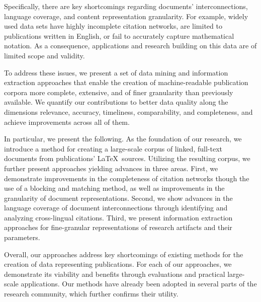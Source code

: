 Specifically, there are key shortcomings regarding documents' interconnections, language coverage, and content representation granularity.
For example, widely used data sets have highly incomplete citation networks, are limited to publications written in English, or fail to accurately capture mathematical notation. As a consequence, applications and research building on this data are of limited scope and validity.

To address these issues, we present a set of data mining and information extraction approaches that enable the creation of machine-readable publication corpora more complete, extensive, and of finer granularity than previously available.
We quantify our contributions to better data quality along the dimensions relevance, accuracy, timeliness, comparability, and completeness, and achieve improvements across all of them.

In particular, we present the following.
As the foundation of our research, we introduce a method for creating a large-scale corpus of linked, full-text documents from publications' \LaTeX\ sources.
Utilizing the resulting corpus, we further present approaches yielding advances in three areas.
First, we demonstrate improvements in the completeness of citation networks though the use of a blocking and matching method, as well as improvements in the granularity of document representations.
Second, we show advances in the language coverage of document interconnections through identifying and analyzing cross-lingual citations.
Third, we present information extraction approaches for fine-granular representations of research artifacts and their parameters.

Overall, our approaches address key shortcomings of existing methods for the creation of data representing publications.
For each of our approaches, we demonstrate its viability and benefits through evaluations and practical large-scale applications.
Our methods have already been adopted in several parts of the research community, which further confirms their utility.
